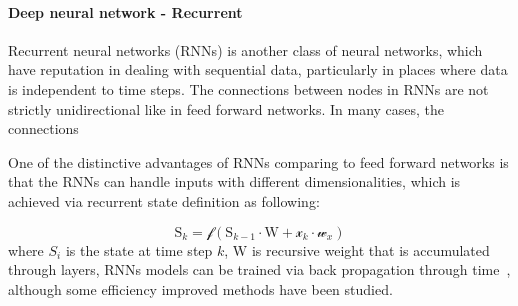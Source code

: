 \paragraph{Deep neural network - Recurrent}
Recurrent neural networks (RNNs) is another class of neural networks, which have reputation in dealing with sequential data, particularly in places where data is independent to time steps. The connections between nodes in RNNs are not strictly unidirectional like in feed forward networks. In many cases, the connections 
\par 
One of the distinctive advantages of RNNs comparing to feed forward networks is that the RNNs can handle inputs with different dimensionalities, which is achieved via recurrent state definition as following:

\begin{equation}
    \mathrm{S}_k = \mathcal{f}(\mathrm{S}_{k-1} \cdot \mathrm{W} + \mathcal{x}_k \cdot \mathcal{w}_x)
\end{equation}
where $S_i$ is the state at time step $k$, $\mathrm{W}$ is recursive weight that is accumulated through layers, 
RNNs models can be trained via back propagation through time~\cite{Goodfellow-et-al-2016}, although some efficiency improved methods have been studied.~\cite{963769,neco.1989,Gomez:2008:ANE:1390681.1390712}